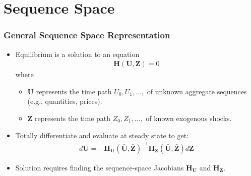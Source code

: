 \documentclass[english,xcolor=svgnames]{beamer}
\begin{document}
\section{Sequence Space}

\begin{frame}
    \frametitle{General Sequence Space Representation}
    \begin{itemize}
        \item Equilibrium is a solution to an equation
        \begin{align*}
        	\mathbf{H}(\mathbf{U}, \mathbf{Z}) = 0
        \end{align*}
        where
        \begin{itemize}
        	\item $\mathbf{U}$ represents the time path $U_0,U_1,...,$ of unknown aggregate sequences (e.g., quantities, prices).
        	\item $\mathbf{Z}$ represents the time path $Z_0,Z_1,...,$ of known exogenous shocks.
        \end{itemize}
        \item Totally differentiate and evaluate at steady state to get:
        \begin{align*}
        	d\mathbf{U} = -\mathbf{H}_{\mathbf{U}}(\mathbf{\bar{U}}, \mathbf{\bar{Z}})^{-1}\mathbf{H}_{\mathbf{Z}}(\mathbf{\bar{U}}, \mathbf{\bar{Z}})d\mathbf{Z}
        \end{align*}
        \item Solution requires finding the sequence-space Jacobians $\mathbf{H}_{\mathbf{U}}$ and $\mathbf{H}_{\mathbf{Z}}$.
	\end{itemize}
\end{frame}
\end{document}

